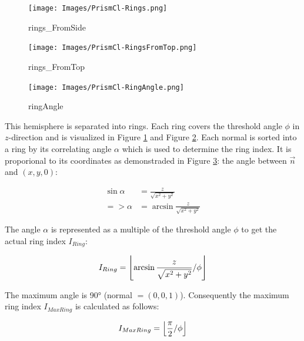 \documentclass[../ClassicThesis.tex]{subfiles}
\begin{document}
\begin{figure}
    \texttt{[image: Images/PrismCl-Rings.png]}
    \caption{rings_FromSide}
    \label{fig:rings_FromSide}
\end{figure}

\begin{figure}
    \texttt{[image: Images/PrismCl-RingsFromTop.png]}
    \caption{rings_FromTop}
    \label{fig:rings_FromTop}
\end{figure}

\begin{figure}
    \texttt{[image: Images/PrismCl-RingAngle.png]}
    \caption{ringAngle}
    \label{fig:ringAngle}
\end{figure}


This hemisphere is separated into rings. Each ring covers the threshold angle $\phi$ in $z$-direction and is visualized in Figure \ref{fig:rings_FromSide} and Figure \ref{fig:rings_FromTop}. Each normal is sorted into a ring by its correlating angle $\alpha$ which is used to determine the ring index. It is proporional to its coordinates as demonstraded in Figure \ref{fig:ringAngle}: the angle between $\vec{n}$ and $(x,y,0)$:

\begin{equation*}
\begin{split}
    \sin{\alpha} & = \frac{z}{ \sqrt{x^{2} + y^{2}} } \\
    => \alpha  & = \arcsin{ \frac{z}{ \sqrt{x^{2} + y^{2}} } }
\end{split}
\end{equation*}


The angle $\alpha$ is represented as a multiple of the threshold angle $\phi$ to get the actual ring index $I_{Ring}$:

\begin{equation*}
    I_{Ring} = \floor*{ 
                    \arcsin{ 
                        \frac{z}{ \sqrt{ x^{2} + y^{2} } } 
                    } 
                    / \phi 
                }
\end{equation*}

The maximum angle is 90° (normal $ = (0,0,1)$). Consequently the maximum ring index $I_{MaxRing}$ is calculated as follows:

\begin{equation*}
    I_{MaxRing} = \floor*{
                    \frac{\pi}{2}
                    / \phi
                  }
\end{equation*}
\end{document}
